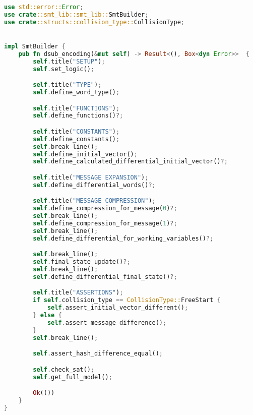 \begin{lstlisting}[language=rust, caption={smt\_lib/encodings/dsub.rs}]
use std::error::Error;
use crate::smt_lib::smt_lib::SmtBuilder;
use crate::structs::collision_type::CollisionType;


impl SmtBuilder {
	pub fn dsub_encoding(&mut self) -> Result<(), Box<dyn Error>>  {
		self.title("SETUP");
		self.set_logic();

		self.title("TYPE");
		self.define_word_type();

		self.title("FUNCTIONS");
		self.define_functions()?;

		self.title("CONSTANTS");
		self.define_constants();
		self.break_line();
		self.define_initial_vector();
		self.define_calculated_differential_initial_vector()?;

		self.title("MESSAGE EXPANSION");
		self.define_differential_words()?;

		self.title("MESSAGE COMPRESSION");
		self.define_compression_for_message(0)?;
		self.break_line();
		self.define_compression_for_message(1)?;
		self.break_line();
		self.define_differential_for_working_variables()?;

		self.break_line();
		self.final_state_update()?;
		self.break_line();
		self.define_differential_final_state()?;

		self.title("ASSERTIONS");
		if self.collision_type == CollisionType::FreeStart {
			self.assert_initial_vector_different();
		} else {
			self.assert_message_difference();
		}
		self.break_line();

		self.assert_hash_difference_equal();

		self.check_sat();
		self.get_full_model();

		Ok(())
	}
}
\end{lstlisting}

